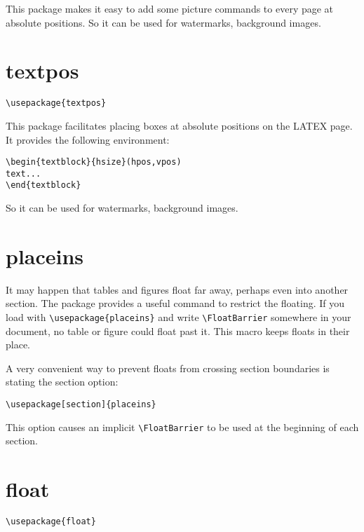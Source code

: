 This package makes it easy to add some picture commands to every page
at absolute positions. So it can be used for watermarks, background images.



\section{textpos}
\label{sec:textpos}
\begin{lstlisting}
\usepackage{textpos}
\end{lstlisting}

This package facilitates placing boxes at absolute positions on the
LATEX page. It provides the following environment:
\begin{lstlisting}
\begin{textblock}{hsize}(hpos,vpos) 
text...
\end{textblock}

\end{lstlisting}


So it can be used for watermarks, background images.


\section*{placeins}
\label{sec:placeins}
It may happen that tables and figures float far away, perhaps even
into another section. The  package provides a
useful command to restrict the floating. If you load
 with \lstinline|\usepackage{placeins}| and write
\lstinline|\FloatBarrier| somewhere in your document, no table or
figure could float past it. This macro keeps floats in their place.

A very convenient way to prevent floats from crossing section
boundaries is stating the section option:
\begin{lstlisting}
\usepackage[section]{placeins}
\end{lstlisting}

This option causes an implicit \lstinline|\FloatBarrier| to be used at the beginning of each section.


\section{float}
\label{sec:float}
\begin{lstlisting}
\usepackage{float}
\end{lstlisting}


